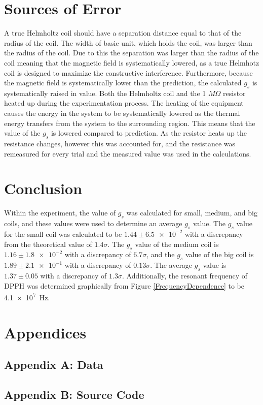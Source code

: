 \documentclass[a4paper]{article}
\begin{document}
\section{Sources of Error}
\qq A true Helmholtz coil should have a separation distance equal to
that of the radius of the coil. The width of basic unit, which holds
the coil, was larger than the radius of the coil. Due to this the
separation was larger than the radius of the coil meaning that the
magnetic field is systematically lowered, as a true Helmhotz coil is
designed to maximize the constructive interference.  Furthermore,
because the magnetic field is systematically lower than the
prediction, the calculated $g_s$ is systematically raised in
value. Both the Helmholtz coil and the 1 $M \Omega$ resistor heated up
during the experimentation process. The heating of the equipment
causes the energy in the system to be systematically lowered as the
thermal energy transfers from the system to the surrounding region. This means
that the value of the $g_s$ is lowered compared to prediction. As the
resistor heats up the resistance changes, however this was accounted
for, and the resistance was remeasured for every trial and the
measured value was used in the calculations.

\section{Conclusion}
\qq Within the experiment, the value of \( g_s \) was calculated for small,
medium, and big coils, and these values were used to determine an average
\( g_s \) value. The \( g_s \) value for the small coil was calculated to be
\( 1.44 \pm \num{6.5e-2} \) with a discrepancy from the theoretical value of
\( 1.4 \sigma \). The \( g_s \) value of the medium coil is
\( 1.16 \pm \num{1.8e-2} \) with a discrepancy of \( 6.7 \sigma \), and the
\( g_s \) value of the big coil is \( 1.89 \pm \num{2.1e-1} \) with a
discrepancy of \( 0.13 \sigma \). The average \( g_s \) value is
\( 1.37 \pm 0.05 \) with a discrepancy of \( 1.3 \sigma \). Additionally, the
resonant frequency of DPPH was determined graphically from Figure
\ref{FrequencyDependence} to be \SI{4.1e7}{\hertz}.

\section{Appendices}

\subsection{Appendix A: Data}

\subsection{Appendix B: Source Code}
\end{document}
